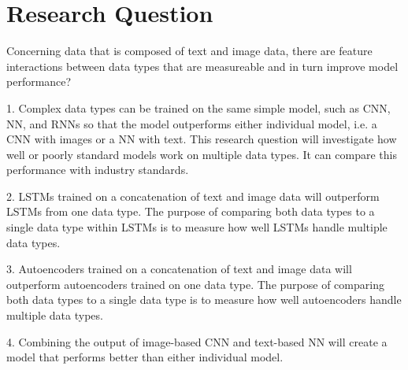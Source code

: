 \chapter{Research Question}


Concerning data that is composed of text and image data, there are feature interactions between data types that are measureable and in turn improve model performance?


1. Complex data types can be trained on the same simple model, such as CNN, NN, and RNNs so that the model outperforms either individual model, i.e. a CNN with images or a NN with text.  This research question will investigate how well or poorly standard models work on multiple data types. It can compare this performance with industry standards.

2. LSTMs trained on a concatenation of text and image data will outperform LSTMs from one data type.  The purpose of comparing both data types to a single data type within LSTMs is to measure how well LSTMs handle multiple data types.

3. Autoencoders trained on a concatenation of text and image data will outperform autoencoders trained on one data type.  The purpose of comparing both data types to a single data type is to measure how well autoencoders handle multiple data types.

4. Combining the output of image-based CNN and text-based NN will create a model that performs better than either individual model.





